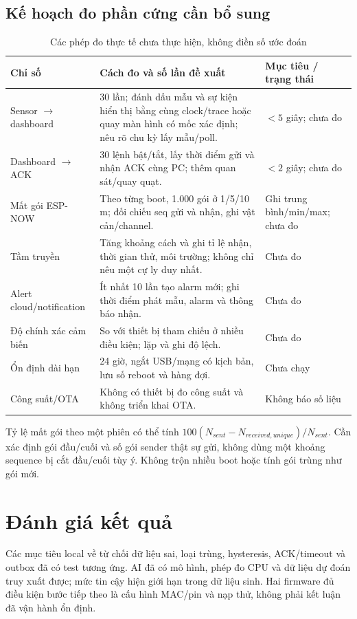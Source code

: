 \subsection{Kế hoạch đo phần cứng cần bổ sung}
\begin{longtable}{P{4cm}P{7.2cm}P{3.5cm}}
\caption{Các phép đo thực tế chưa thực hiện, không điền số ước đoán}\\
\toprule Chỉ số & Cách đo và số lần đề xuất & Mục tiêu / trạng thái \\ \midrule
Sensor $\rightarrow$ dashboard & 30 lần; đánh dấu mẫu và sự kiện hiển thị bằng cùng clock/trace hoặc quay màn hình có mốc xác định; nêu rõ chu kỳ lấy mẫu/poll. & $<5$ giây; chưa đo \\
Dashboard $\rightarrow$ ACK & 30 lệnh bật/tắt, lấy thời điểm gửi và nhận ACK cùng PC; thêm quan sát/quay quạt. & $<2$ giây; chưa đo \\
Mất gói ESP-NOW & Theo từng boot, 1.000 gói ở 1/5/10 m; đối chiếu seq gửi và nhận, ghi vật cản/channel. & Ghi trung bình/min/max; chưa đo \\
Tầm truyền & Tăng khoảng cách và ghi tỉ lệ nhận, thời gian thử, môi trường; không chỉ nêu một cự ly duy nhất. & Chưa đo \\
Alert cloud/notification & Ít nhất 10 lần tạo alarm mới; ghi thời điểm phát mẫu, alarm và thông báo nhận. & Chưa đo \\
Độ chính xác cảm biến & So với thiết bị tham chiếu ở nhiều điều kiện; lặp và ghi độ lệch. & Chưa đo \\
Ổn định dài hạn & 24 giờ, ngắt USB/mạng có kịch bản, lưu số reboot và hàng đợi. & Chưa chạy \\
Công suất/OTA & Không có thiết bị đo công suất và không triển khai OTA. & Không báo số liệu \\
\bottomrule
\end{longtable}
Tỷ lệ mất gói theo một phiên có thể tính $100(N_{sent}-N_{received,unique})/N_{sent}$. Cần xác định gói đầu/cuối và số gói sender thật sự gửi, không dùng một khoảng sequence bị cắt đầu/cuối tùy ý. Không trộn nhiều boot hoặc tính gói trùng như gói mới.

\section{Đánh giá kết quả}
Các mục tiêu local về từ chối dữ liệu sai, loại trùng, hysteresis, ACK/timeout và outbox đã có test tương ứng. AI đã có mô hình, phép đo CPU và dữ liệu dự đoán truy xuất được; mức tin cậy hiện giới hạn trong dữ liệu sinh. Hai firmware đủ điều kiện bước tiếp theo là cấu hình MAC/pin và nạp thử, không phải kết luận đã vận hành ổn định.

